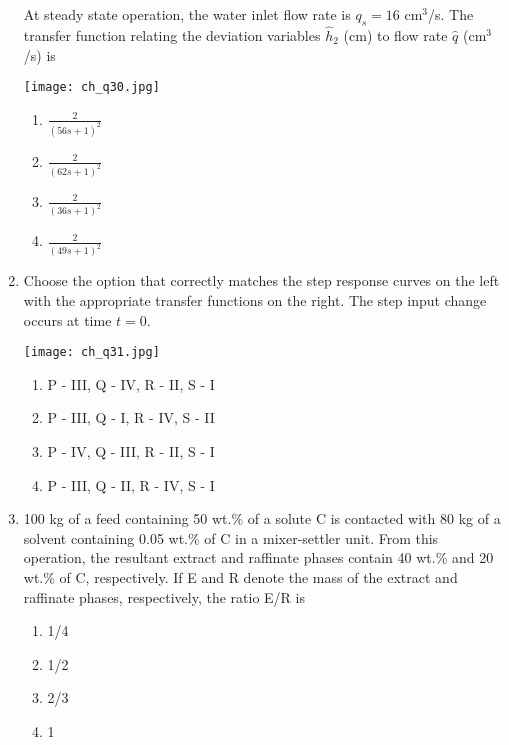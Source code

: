 \documentclass[12pt]{article}
\begin{document}
\begin{enumerate}[label=Q.\arabic*]
			At steady state operation, the water inlet flow rate is $q_s = 16$ cm$^3$/s. The transfer function relating the deviation variables $\hat{h}_2$ (cm) to flow rate $\hat{q}$ (cm$^3$/s) is

			\begin{center}{
					\texttt{[image: ch\_q30.jpg]}
			}\end{center}

			\begin{multicols}{2}
				\begin{enumerate}[label=(\Alph*)]
					\item $\frac{2}{(56s + 1)^2}$
					\item $\frac{2}{(62s + 1)^2}$
					\item $\frac{2}{(36s + 1)^2}$
					\item $\frac{2}{(49s + 1)^2}$
				\end{enumerate}
			\end{multicols}


		\item Choose the option that correctly matches the step response curves on the left with the appropriate transfer functions on the right. The step input change occurs at time $t = 0$.

			\begin{center}{
					\texttt{[image: ch\_q31.jpg]}
			}\end{center}

			\begin{multicols}{2}
				\begin{enumerate}[label=(\Alph*)]
					\item P - III, Q - IV, R - II, S - I
					\item P - III, Q - I, R - IV, S - II
					\item P - IV, Q - III, R - II, S - I
					\item P - III, Q - II, R - IV, S - I
				\end{enumerate}
			\end{multicols}

		\item 100 kg of a feed containing 50 wt.\% of a solute C is contacted with 80 kg of a solvent containing 0.05 wt.\% of C in a mixer-settler unit. From this operation, the resultant extract and raffinate phases contain 40 wt.\% and 20 wt.\% of C, respectively. If E and R denote the mass of the extract and raffinate phases, respectively, the ratio E/R is
			\begin{multicols}{2}
				\begin{enumerate}[label=(\Alph*)]
					\item 1/4
					\item 1/2
					\item 2/3
					\item 1
				\end{enumerate}
			\end{multicols}


\end{enumerate}
\end{document}
